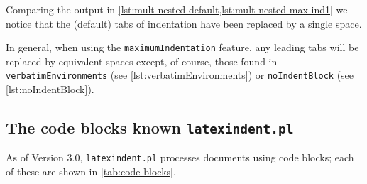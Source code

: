 	Comparing the output in \cref{lst:mult-nested-default,lst:mult-nested-max-ind1} we notice that the (default) tabs
	of indentation have been replaced by a single space.

	In general, when using the \texttt{maximumIndentation} feature, any leading tabs will be replaced by equivalent
	spaces except, of course, those found in \texttt{verbatimEnvironments} (see \vref{lst:verbatimEnvironments}) or \texttt{noIndentBlock} (see \vref{lst:noIndentBlock}).

\subsection{The code blocks known \texttt{latexindent.pl}}\label{subsubsec:code-blocks}
	As of Version 3.0, \texttt{latexindent.pl} processes documents using code blocks; each
	of these are shown in \cref{tab:code-blocks}.

